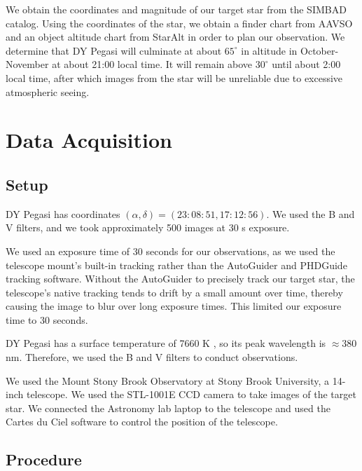 \documentclass[twocolumn]{aastex631}
\newcommand{\degree}{^\circ}
\newcommand{\RA}{\alpha}
\newcommand{\Dec}{\delta}
\begin{document}
We obtain the coordinates and magnitude of our target star from the SIMBAD catalog. Using the coordinates of the star, we obtain a finder chart from AAVSO and an object altitude chart from StarAlt  in order to plan our observation. We determine that DY Pegasi will culminate at about $65\degree$ in altitude in October-November at about 21:00 local time. It will remain above $30\degree$ until about 2:00 local time, after which images from the star will be unreliable due to excessive atmospheric seeing.


\section{Data Acquisition} \label{sec:observation}


\subsection{Setup}

DY Pegasi has coordinates $(\RA, \Dec) = (23:08:51, 17:12:56)$. We used the B and V filters, and we took approximately 500 images at 30 s exposure.

We used an exposure time of 30 seconds for our observations, as we used the telescope mount's built-in tracking rather than the AutoGuider and PHDGuide tracking software. Without the AutoGuider to precisely track our target star, the telescope's native tracking tends to drift by a small amount over time, thereby causing the image to blur over long exposure times. This limited our exposure time to 30 seconds.

DY Pegasi has a surface temperature of 7660 K \citep{Hintz_2004}, so its peak wavelength is $\approx 380$ nm. Therefore, we used the B and V filters to conduct observations.

We used the Mount Stony Brook Observatory at Stony Brook University, a 14-inch telescope. We used the STL-1001E CCD camera to take images of the target star. We connected the Astronomy lab laptop to the telescope and used the Cartes du Ciel software to control the position of the telescope.


\subsection{Procedure}
\end{document}
